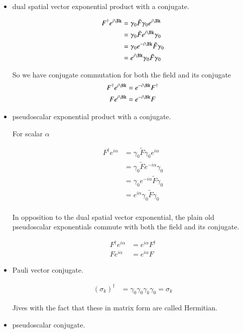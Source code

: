 \documentclass{article}
\begin{document}
\begin{itemize}
\item dual spatial vector exponential product with a conjugate.

\begin{align*}
F^\dagger  e^{i\Bk} 
&= \gamma_0 \tilde{F} \gamma_0 e^{i\Bk} \\
&= \gamma_0 \tilde{F} e^{i\Bk} \gamma_0 \\
&= \gamma_0 e^{-i\Bk} \tilde{F} \gamma_0 \\
&= e^{i\Bk} \gamma_0 \tilde{F} \gamma_0 \\
\end{align*}

So we have conjugate commutation for both the field and its conjugate
\begin{align}
F^\dagger e^{i\Bk} &= e^{-i\Bk} F^\dagger \\
F e^{i\Bk} &= e^{-i\Bk} F
\end{align}

\item pseudoscalar exponential product with a conjugate.

For scalar $\alpha$

\begin{align*}
F^\dagger  e^{i\alpha} 
&= \gamma_0 \tilde{F} \gamma_0 e^{i\alpha} \\
&= \gamma_0 \tilde{F} e^{-i\alpha} \gamma_0 \\
&= \gamma_0 e^{-i\alpha} \tilde{F} \gamma_0 \\
&= e^{i\alpha} \gamma_0 \tilde{F} \gamma_0 \\
\end{align*}

In opposition to the dual spatial vector exponential, the plain old pseudoscalar exponentials commute with 
both the field and its conjugate.

\begin{align}
F^\dagger e^{i\alpha} &= e^{i\alpha} F^\dagger \\
F e^{i\alpha} &= e^{i\alpha} F
\end{align}

\item Pauli vector conjugate.

\begin{align}
(\sigma_k)^\dagger &= \gamma_0 \gamma_0 \gamma_k \gamma_0 = \sigma_k
\end{align}

Jives with the fact that these in matrix form are called Hermitian.

\item pseudoscalar conjugate.


\end{itemize}
\end{document}
